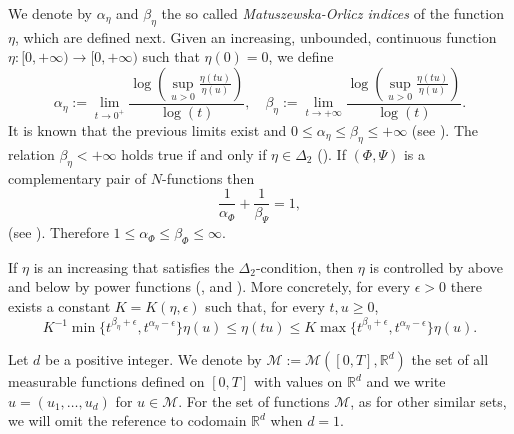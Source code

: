 \documentclass[twoside]{article}
\theoremstyle{remark}
\newcommand{\rr}{\mathbb{R}}
\renewcommand{\leq}{\leqslant}
\renewcommand{\geq}{\geqslant}
\begin{document}
We denote by $\alpha_{\eta}$ and $\beta_{\eta}$ the so called  \emph{Matuszewska-Orlicz indices} of the function $\eta$, which are defined next. Given
an increasing, unbounded, continuous function   $\eta:[ 0,+\infty)\to [0,+\infty)$ such that $\eta(0)=0$, we define
\begin{equation}\label{MO_indices}
    \alpha_{\eta}:=\lim\limits_{t\to 0^{+}}\frac{\log \left (\sup\limits_{u>0}\frac{\eta(t u)}{\eta(u)} \right ) }{\log(t)},\quad
    \beta_{\eta}:=\lim\limits_{t\to +\infty}\frac{\log \left  (\sup\limits_{u>0}\frac{\eta(t u)}{\eta(u)}\right )}{\log(t)}.
\end{equation}
It is known that the previous limits exist and  $0\leq \alpha_{\eta}\leq \beta_{\eta}\leq +\infty$ 
(see \cite[p. 84]{M}). The relation $\beta_{\eta}<+\infty$ holds true if and only if $\eta \in \Delta_2$
(\cite[Thm. 11.7]{M}). If $(\Phi,\Psi)$ is a complementary pair of  $N$-functions then
\begin{equation}\label{compl_ind}
 \frac{1}{\alpha_{\Phi}}+\frac{1}{\beta_{\Psi}}=1,
\end{equation}
(see \cite[Cor. 11.6]{M}). Therefore $1\leq \alpha_{\Phi}\leq\beta_{\Phi}\leq \infty $.

 If $\eta$ is an increasing that satisfies the $\Delta_2$-condition, then $\eta$ is controlled by above and below
 by power functions (\cite[Sec. 1]{Gustavsson1977}, \cite[Eq. (2.3)-(2.4)]{fiorenza1997indices} and \cite[Thm. 11.13]{M}).   More concretely, for every $\epsilon>0$ there exists a
constant $K=K(\eta,\epsilon)$ such that, for every $t,u\geq 0$,
\begin{equation}\label{delta2-potencias}
    K^{-1}\min\big\{t^{\beta_{\eta}+\epsilon},t^{\alpha_{\eta}-\epsilon} \big\}\eta(u)\leq \eta(t u)\leq
    K\max\big\{t^{\beta_{\eta}+\epsilon},t^{\alpha_{\eta}-\epsilon} \big\}\eta(u).
\end{equation}



Let $d$ be a positive integer. We denote by $\mathcal{M}:=\mathcal{M}([0,T],\rr^d)$  the set of all measurable functions defined on $[0,T]$ with values on $\mathbb{R}^d$ and  we write $u=(u_1,\dots,u_d)$ for  $u\in \mathcal{M}$. For the set of functions $\mathcal{M}$, as for other similar sets, we will omit the reference to codomain $\mathbb{R}^d$ when $d=1$.
\end{document}
